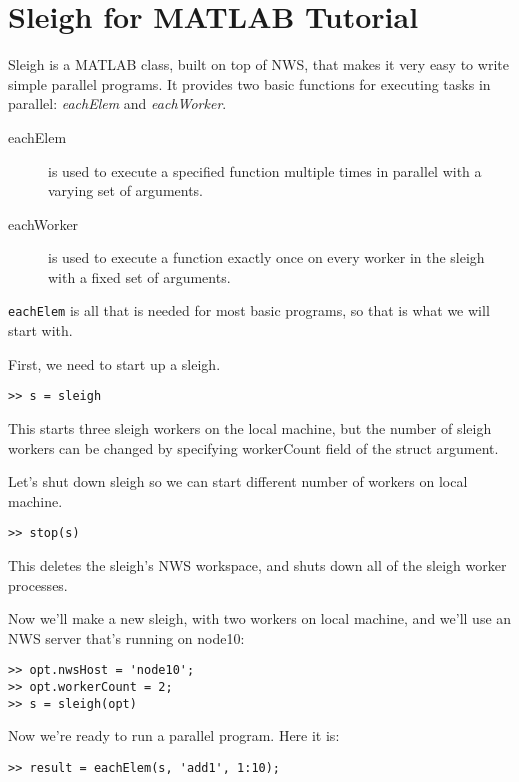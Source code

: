 \section{Sleigh for MATLAB Tutorial}
Sleigh is a MATLAB class, built on top of NWS, that makes it very easy to
write simple parallel programs.  It provides two basic functions for
executing tasks in parallel: \textit{eachElem} and \textit{eachWorker}.

\begin{description}
\item[eachElem] is used to execute a specified function multiple times in
parallel with a varying set of arguments.
\item[eachWorker] is used to execute a function exactly once on every worker in
the sleigh with a fixed set of arguments.
\end{description}

\texttt{eachElem} is all that is needed for most basic programs, so that
is what we will start with.

First, we need to start up a sleigh.

\begin{verbatim}
>> s = sleigh
\end{verbatim}

This starts three sleigh workers on the local machine, but the number of
sleigh workers can be changed by specifying workerCount field of the
struct argument. 

Let's shut down sleigh so we can start different number of workers on
local machine. 

\begin{verbatim}
>> stop(s)
\end{verbatim}

This deletes the sleigh's NWS workspace, and shuts down all of the
sleigh worker processes.

Now we'll make a new sleigh, with two workers on local machine, and
we'll use an NWS server that's running on node10:

\begin{samepage}
\begin{verbatim}
>> opt.nwsHost = 'node10';
>> opt.workerCount = 2;
>> s = sleigh(opt)
\end{verbatim}
\end{samepage}

Now we're ready to run a parallel program.  Here it is:

\begin{verbatim}
>> result = eachElem(s, 'add1', 1:10);
\end{verbatim}

